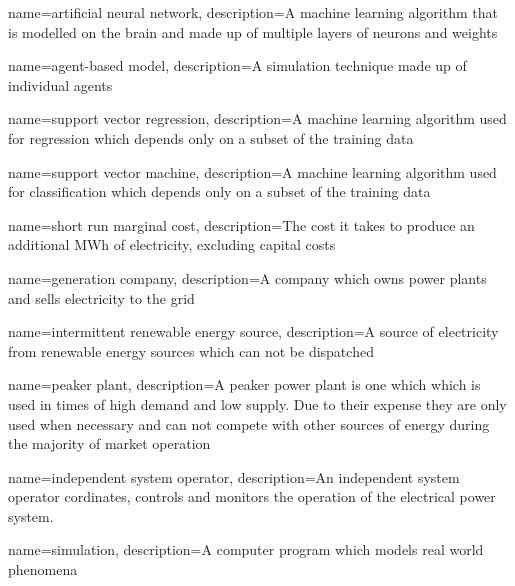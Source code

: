 {
        name=artificial neural network,
        description={A machine learning algorithm that is modelled on the brain and made up of multiple layers of neurons and weights}
}



{
        name=agent-based model,
        description={A simulation technique made up of individual agents}
}




{
        name=support vector regression,
        description={A machine learning algorithm used for regression which depends only on a subset of the training data}
}




{
	name=support vector machine,
	description={A machine learning algorithm used for classification which depends only on a subset of the training data}
}






{
	name=short run marginal cost,
	description={The cost it takes to produce an additional MWh of electricity, excluding capital costs}
}



{
	name=generation company,
	description={A company which owns power plants and sells electricity to the grid}
}




{
	name=intermittent renewable energy source,
	description={A source of electricity from renewable energy sources which can not be dispatched}
}


{
	name=peaker plant,
	description={A peaker power plant is one which which is used in times of high demand and low supply. Due to their expense they are only used when necessary and can not compete with other sources of energy during the majority of market operation}
}


{
	name=independent system operator,
	description={An independent system operator cordinates, controls and monitors the operation of the electrical power system.}
}



{
	name=simulation,
	description={A computer program which models real world phenomena}
}



